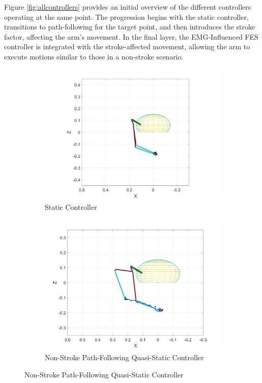 Figure \ref{fig:allcontrollers} provides an initial overview of the different controllers operating at the same point. The progression begins with the static controller, transitions to path-following for the target point, and then introduces the stroke factor, affecting the arm's movement. In the final layer, the EMG-Influenced FES controller is integrated with the stroke-affected movement, allowing the arm to execute motions similar to those in a non-stroke scenario.

\begin{figure}[ht]
    \centering

    \begin{subfigure}[b]{0.5\textwidth}
        \centering

        \includegraphics[width=0.75\linewidth]{Pictures/Controller/StaticControl_WP.png}
        \caption{Static Controller                                   }
    \end{subfigure}%
    \hfill
    \begin{subfigure}[b]{0.5\textwidth}
        \centering

        \includegraphics[width=0.75\linewidth]{Pictures/Results/Controller/Healthy_WP.png}
        \caption{Non-Stroke Path-Following Quasi-Static Controller}
    \end{subfigure}


\end{figure}
